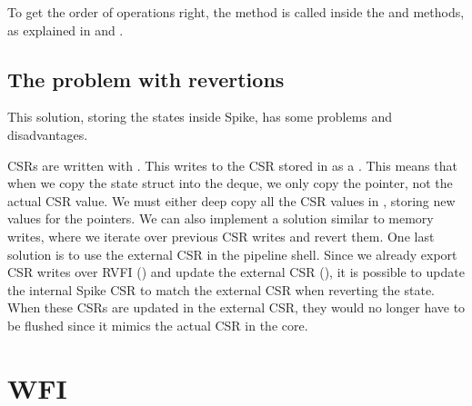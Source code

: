 To get the order of operations right, the  method is called inside the  and  methods, as explained in  and .

\subsection{The problem with revertions}

This solution, storing the states inside Spike, has some problems and disadvantages.

CSRs are written with . This writes to the CSR stored in  as a . This means that when we copy the state struct into the deque, we only copy the pointer, not the actual CSR value. We must either deep copy all the CSR values in , storing new values for the pointers. We can also implement a solution similar to memory writes, where we iterate over previous CSR writes and revert them. One last solution is to use the external CSR in the pipeline shell. Since we already export CSR writes over RVFI () and update the external CSR (), it is possible to update the internal Spike CSR to match the external CSR when reverting the state. When these CSRs are updated in the external CSR, they would no longer have to be flushed since it mimics the actual CSR in the core.


%
%



\section{WFI}
\label{sec:wfi}


